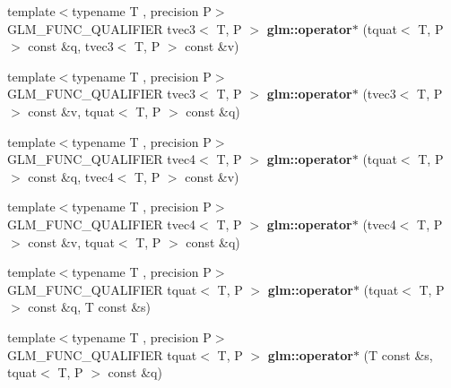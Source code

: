 \begin{DoxyCompactItemize}
\item 
\hypertarget{group__gtc__quaternion_ga5b0cccc7f163f2b7bbf3536deb403d9a}{{\footnotesize template$<$typename T , precision P$>$ }\\G\-L\-M\-\_\-\-F\-U\-N\-C\-\_\-\-Q\-U\-A\-L\-I\-F\-I\-E\-R tvec3$<$ T, P $>$ {\bfseries glm\-::operator$\ast$} (tquat$<$ T, P $>$ const \&q, tvec3$<$ T, P $>$ const \&v)}\label{group__gtc__quaternion_ga5b0cccc7f163f2b7bbf3536deb403d9a}

\item 
\hypertarget{group__gtc__quaternion_ga70dbac44fc9fb59659218ad4ed7870ed}{{\footnotesize template$<$typename T , precision P$>$ }\\G\-L\-M\-\_\-\-F\-U\-N\-C\-\_\-\-Q\-U\-A\-L\-I\-F\-I\-E\-R tvec3$<$ T, P $>$ {\bfseries glm\-::operator$\ast$} (tvec3$<$ T, P $>$ const \&v, tquat$<$ T, P $>$ const \&q)}\label{group__gtc__quaternion_ga70dbac44fc9fb59659218ad4ed7870ed}

\item 
\hypertarget{group__gtc__quaternion_gaeee3d385665cb25b6d728524b8d8fa66}{{\footnotesize template$<$typename T , precision P$>$ }\\G\-L\-M\-\_\-\-F\-U\-N\-C\-\_\-\-Q\-U\-A\-L\-I\-F\-I\-E\-R tvec4$<$ T, P $>$ {\bfseries glm\-::operator$\ast$} (tquat$<$ T, P $>$ const \&q, tvec4$<$ T, P $>$ const \&v)}\label{group__gtc__quaternion_gaeee3d385665cb25b6d728524b8d8fa66}

\item 
\hypertarget{group__gtc__quaternion_ga9f4715d30e26cde878f16fef75b8e049}{{\footnotesize template$<$typename T , precision P$>$ }\\G\-L\-M\-\_\-\-F\-U\-N\-C\-\_\-\-Q\-U\-A\-L\-I\-F\-I\-E\-R tvec4$<$ T, P $>$ {\bfseries glm\-::operator$\ast$} (tvec4$<$ T, P $>$ const \&v, tquat$<$ T, P $>$ const \&q)}\label{group__gtc__quaternion_ga9f4715d30e26cde878f16fef75b8e049}

\item 
\hypertarget{group__gtc__quaternion_ga64f3ff448c382fd6642eafddd6ff65ea}{{\footnotesize template$<$typename T , precision P$>$ }\\G\-L\-M\-\_\-\-F\-U\-N\-C\-\_\-\-Q\-U\-A\-L\-I\-F\-I\-E\-R tquat$<$ T, P $>$ {\bfseries glm\-::operator$\ast$} (tquat$<$ T, P $>$ const \&q, T const \&s)}\label{group__gtc__quaternion_ga64f3ff448c382fd6642eafddd6ff65ea}

\item 
\hypertarget{group__gtc__quaternion_ga8b18b7e92f80b6b26550a1035bca33ba}{{\footnotesize template$<$typename T , precision P$>$ }\\G\-L\-M\-\_\-\-F\-U\-N\-C\-\_\-\-Q\-U\-A\-L\-I\-F\-I\-E\-R tquat$<$ T, P $>$ {\bfseries glm\-::operator$\ast$} (T const \&s, tquat$<$ T, P $>$ const \&q)}\label{group__gtc__quaternion_ga8b18b7e92f80b6b26550a1035bca33ba}


\end{DoxyCompactItemize}

